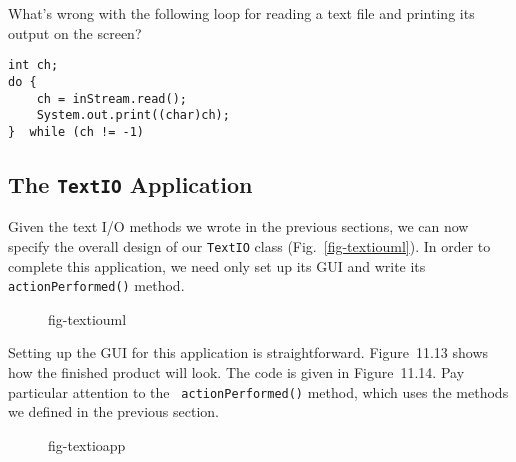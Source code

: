 \begin{SSTUDY}

\item  What's wrong with the following loop for reading
a text file and printing its output on the screen?

\begin{jjjlisting}
\begin{lstlisting}
int ch;
do {
    ch = inStream.read();
    System.out.print((char)ch);
}  while (ch != -1) 
\end{lstlisting}
\end{jjjlisting}
\end{SSTUDY}

\subsection{The {\tt TextIO} Application}
\noindent Given the text I/O methods we wrote in the previous sections, we can
now specify the overall design of our {\tt TextIO} class
(Fig.~\ref{fig-textiouml}).  In order to complete this application, we
need only set up its GUI and write its {\tt action\-Performed()} method.

\begin{figure}[h!]
 {fig-textiouml}
\end{figure}

\noindent Setting up the GUI for this application is straightforward.
Figure~11.13 shows how the finished product will look.  The code is
given in Figure~11.14. Pay particular attention to the {\tt
actionPerformed()} method, which uses the methods we defined in the
previous section.

\begin{figure}[h!]
 {fig-textioapp}
\end{figure}

